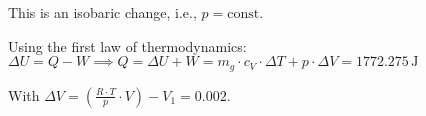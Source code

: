 This is an isobaric change, i.e., \( p = \text{const} \).  

Using the first law of thermodynamics:  
\( \Delta U = Q - W \implies Q = \Delta U + W = m_g \cdot c_V \cdot \Delta T + p \cdot \Delta V = 1772.275 \, \text{J} \)  

With \( \Delta V = \left( \frac{R \cdot T}{p} \cdot V \right) - V_1 = 0.002 \).